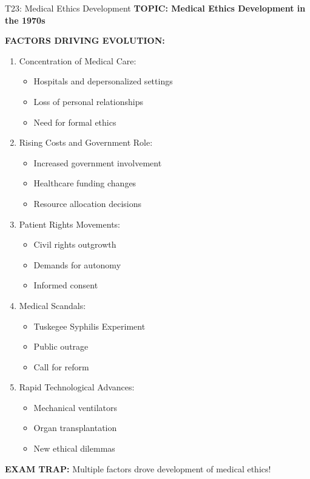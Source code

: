 \documentclass[8pt]{beamer}
\begin{document}
	\begin{frame}{T23: Medical Ethics Development}
		\fontsize{6.5}{7.5}\selectfont
		\textbf{TOPIC: Medical Ethics Development in the 1970s}
		
		\vspace{0.1cm}
		\textbf{FACTORS DRIVING EVOLUTION:}
		\begin{enumerate}
			\item \textcolor{myblue}{Concentration of Medical Care:}
			\begin{itemize}
				\item Hospitals and depersonalized settings
				\item Loss of personal relationships
				\item Need for formal ethics
			\end{itemize}
			\item \textcolor{myblue}{Rising Costs and Government Role:}
			\begin{itemize}
				\item Increased government involvement
				\item Healthcare funding changes
				\item Resource allocation decisions
			\end{itemize}
			\item \textcolor{myblue}{Patient Rights Movements:}
			\begin{itemize}
				\item Civil rights outgrowth
				\item Demands for autonomy
				\item Informed consent
			\end{itemize}
			\item \textcolor{myblue}{Medical Scandals:}
			\begin{itemize}
				\item Tuskegee Syphilis Experiment
				\item Public outrage
				\item Call for reform
			\end{itemize}
			\item \textcolor{myblue}{Rapid Technological Advances:}
			\begin{itemize}
				\item Mechanical ventilators
				\item Organ transplantation
				\item New ethical dilemmas
			\end{itemize}
		\end{enumerate}
		
		\textcolor{myred}{\textbf{EXAM TRAP:}} Multiple factors drove \textcolor{myblue}{development of medical ethics}!
	\end{frame}
	
\end{document}
